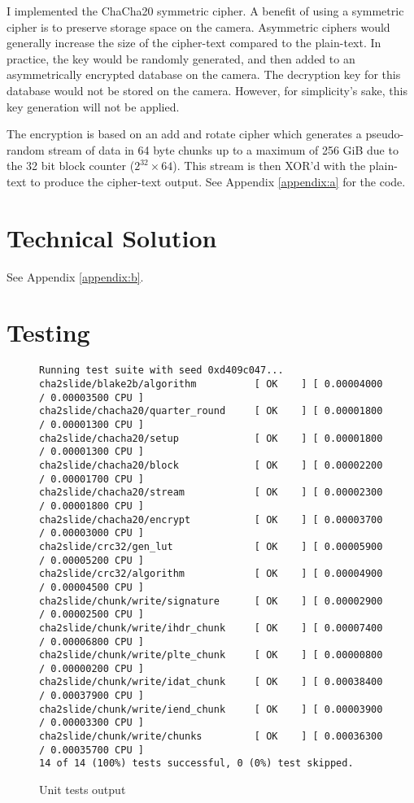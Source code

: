 \documentclass{report}
\begin{document}
I implemented the ChaCha20 symmetric cipher. A benefit of using a symmetric cipher is to preserve storage space on the camera. Asymmetric ciphers would generally increase the size of the cipher-text compared to the plain-text. In practice, the key would be randomly generated, and then added to an asymmetrically encrypted database on the camera. The decryption key for this database would not be stored on the camera. However, for simplicity's sake, this key generation will not be applied.

The encryption is based on an add and rotate cipher which generates a pseudo-random stream of data in 64 byte chunks up to a maximum of 256 GiB due to the 32 bit block counter (${2^{32}}\times64$). This stream is then XOR'd with the plain-text to produce the cipher-text output. See Appendix \ref{appendix:a} for the code.

\chapter{Technical Solution}

See Appendix \ref{appendix:b}.

\chapter{Testing}

\begin{figure}[!htb]
\begin{center}
\begin{verbatim}
Running test suite with seed 0xd409c047...
cha2slide/blake2b/algorithm          [ OK    ] [ 0.00004000 / 0.00003500 CPU ]
cha2slide/chacha20/quarter_round     [ OK    ] [ 0.00001800 / 0.00001300 CPU ]
cha2slide/chacha20/setup             [ OK    ] [ 0.00001800 / 0.00001300 CPU ]
cha2slide/chacha20/block             [ OK    ] [ 0.00002200 / 0.00001700 CPU ]
cha2slide/chacha20/stream            [ OK    ] [ 0.00002300 / 0.00001800 CPU ]
cha2slide/chacha20/encrypt           [ OK    ] [ 0.00003700 / 0.00003000 CPU ]
cha2slide/crc32/gen_lut              [ OK    ] [ 0.00005900 / 0.00005200 CPU ]
cha2slide/crc32/algorithm            [ OK    ] [ 0.00004900 / 0.00004500 CPU ]
cha2slide/chunk/write/signature      [ OK    ] [ 0.00002900 / 0.00002500 CPU ]
cha2slide/chunk/write/ihdr_chunk     [ OK    ] [ 0.00007400 / 0.00006800 CPU ]
cha2slide/chunk/write/plte_chunk     [ OK    ] [ 0.00000800 / 0.00000200 CPU ]
cha2slide/chunk/write/idat_chunk     [ OK    ] [ 0.00038400 / 0.00037900 CPU ]
cha2slide/chunk/write/iend_chunk     [ OK    ] [ 0.00003900 / 0.00003300 CPU ]
cha2slide/chunk/write/chunks         [ OK    ] [ 0.00036300 / 0.00035700 CPU ]
14 of 14 (100%) tests successful, 0 (0%) test skipped.
\end{verbatim}
\end{center}
\caption{Unit tests output}
\label{table:tests}
\end{figure}
\end{document}

